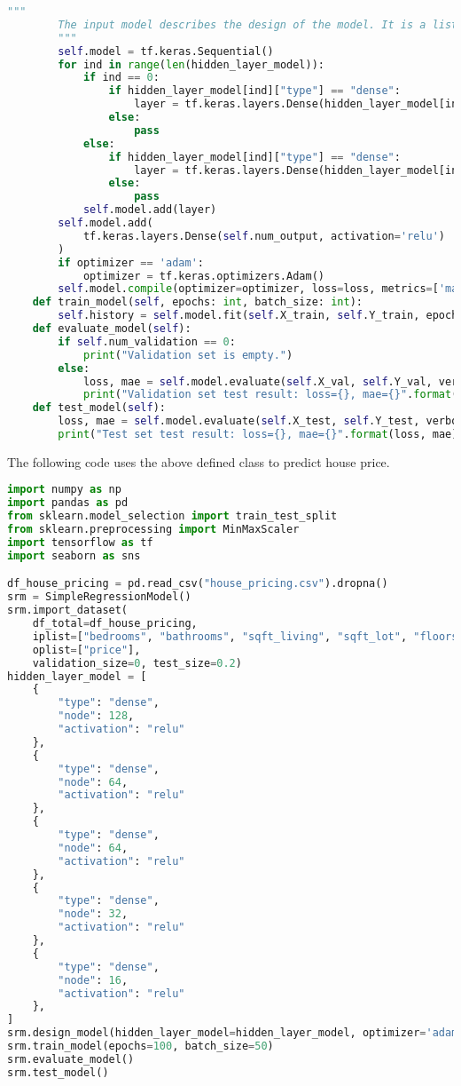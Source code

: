 \begin{lstlisting}[language=Python]
		"""
		The input model describes the design of the model. It is a list of layers. Each layer is given by a dictionary describing layer type, number of nodes, etc.
		"""
		self.model = tf.keras.Sequential()
		for ind in range(len(hidden_layer_model)):
			if ind == 0:
				if hidden_layer_model[ind]["type"] == "dense":
					layer = tf.keras.layers.Dense(hidden_layer_model[ind]["node"], activation = hidden_layer_model[ind]["activation"], input_shape = (self.num_input, ))
				else:
					pass
			else:
				if hidden_layer_model[ind]["type"] == "dense":
					layer = tf.keras.layers.Dense(hidden_layer_model[ind]["node"], activation = hidden_layer_model[ind]["activation"])
				else:
					pass
			self.model.add(layer)
		self.model.add(
			tf.keras.layers.Dense(self.num_output, activation='relu')
		)
		if optimizer == 'adam':
			optimizer = tf.keras.optimizers.Adam()
		self.model.compile(optimizer=optimizer, loss=loss, metrics=['mae'])
	def train_model(self, epochs: int, batch_size: int):
		self.history = self.model.fit(self.X_train, self.Y_train, epochs=epochs, batch_size=batch_size, validation_split=0.2, verbose=2)
	def evaluate_model(self):
		if self.num_validation == 0:
			print("Validation set is empty.")
		else:
			loss, mae = self.model.evaluate(self.X_val, self.Y_val, verbose=2)
			print("Validation set test result: loss={}, mae={}".format(loss, mae))
	def test_model(self):
		loss, mae = self.model.evaluate(self.X_test, self.Y_test, verbose=2)
		print("Test set test result: loss={}, mae={}".format(loss, mae))
\end{lstlisting}

The following code uses the above defined class to predict house price.
\begin{lstlisting}[language=Python]
import numpy as np
import pandas as pd
from sklearn.model_selection import train_test_split
from sklearn.preprocessing import MinMaxScaler
import tensorflow as tf
import seaborn as sns

df_house_pricing = pd.read_csv("house_pricing.csv").dropna()
srm = SimpleRegressionModel()
srm.import_dataset(
    df_total=df_house_pricing,
    iplist=["bedrooms", "bathrooms", "sqft_living", "sqft_lot", "floors", "sqft_above", "sqft_basement", "yr_built", "yr_renovated", "condition", "city"],
    oplist=["price"],
    validation_size=0, test_size=0.2)
hidden_layer_model = [
	{
		"type": "dense",
		"node": 128,
		"activation": "relu"
	},
	{
		"type": "dense",
		"node": 64,
		"activation": "relu"
	},
	{
		"type": "dense",
		"node": 64,
		"activation": "relu"
	},
	{
		"type": "dense",
		"node": 32,
		"activation": "relu"
	},
	{
		"type": "dense",
		"node": 16,
		"activation": "relu"
	},
]
srm.design_model(hidden_layer_model=hidden_layer_model, optimizer='adam', learning_rate=0.001, loss='mse')
srm.train_model(epochs=100, batch_size=50)
srm.evaluate_model()
srm.test_model()
\end{lstlisting}

